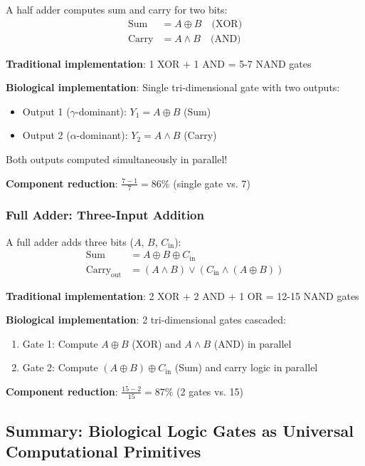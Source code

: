 \documentclass[11pt,a4paper]{article}
\begin{document}
A half adder computes sum and carry for two bits:
\begin{align}
\text{Sum} &= A \oplus B \quad \text{(XOR)} \\
\text{Carry} &= A \land B \quad \text{(AND)}
\end{align}

\textbf{Traditional implementation}: 1 XOR + 1 AND = 5-7 NAND gates

\textbf{Biological implementation}: Single tri-dimensional gate with two outputs:
\begin{itemize}
\item Output 1 ($\gamma$-dominant): $Y_1 = A \oplus B$ (Sum)
\item Output 2 ($\alpha$-dominant): $Y_2 = A \land B$ (Carry)
\end{itemize}

Both outputs computed simultaneously in parallel!

\textbf{Component reduction}: $\frac{7 - 1}{7} = 86\%$ (single gate vs. 7)

\subsubsection{Full Adder: Three-Input Addition}

A full adder adds three bits ($A$, $B$, $C_{\text{in}}$):
\begin{align}
\text{Sum} &= A \oplus B \oplus C_{\text{in}} \\
\text{Carry}_{\text{out}} &= (A \land B) \lor (C_{\text{in}} \land (A \oplus B))
\end{align}

\textbf{Traditional implementation}: 2 XOR + 2 AND + 1 OR = 12-15 NAND gates

\textbf{Biological implementation}: 2 tri-dimensional gates cascaded:
\begin{enumerate}
\item Gate 1: Compute $A \oplus B$ (XOR) and $A \land B$ (AND) in parallel
\item Gate 2: Compute $(A \oplus B) \oplus C_{\text{in}}$ (Sum) and carry logic in parallel
\end{enumerate}

\textbf{Component reduction}: $\frac{15 - 2}{15} = 87\%$ (2 gates vs. 15)

\subsection{Summary: Biological Logic Gates as Universal Computational Primitives}
\end{document}

